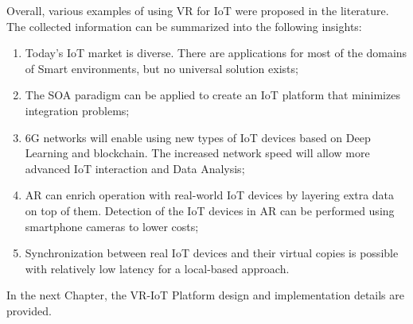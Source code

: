 Overall, various examples of using VR for IoT were proposed in the literature. The collected information can be summarized into the following insights:
\begin{enumerate}
    \item Today's IoT market is diverse. There are applications for most of the domains of Smart environments, but no universal solution exists;
   \item The SOA paradigm can be applied to create an IoT platform that minimizes integration problems;
    \item 6G networks will enable using new types of IoT devices based on Deep Learning and blockchain. The increased network speed will allow more advanced IoT interaction and Data Analysis;
    \item AR can enrich operation with real-world IoT devices by layering extra data on top of them. Detection of the IoT devices in AR can be performed using smartphone cameras to lower costs;
    \item Synchronization between real IoT devices and their virtual copies is possible with relatively low latency for a local-based approach.
\end{enumerate}

In the next Chapter, the VR-IoT Platform design and implementation details are provided.